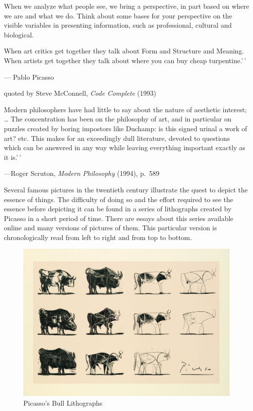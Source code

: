 \hypertarget{different-perspectives-drive-different-views}{%
\label{different-perspectives-drive-different-views}}

When we analyze what people see, we bring a perspective, in part based
on where we are and what we do. Think about some bases for your
perspective on the visible variables in presenting information, such as
professional, cultural and biological.

\smallskip

\noindent {}When art critics get together they talk about Form
and Structure and Meaning. When artists get together they talk about
where you can buy cheap turpentine.'\,'

\hfill --- Pablo Picasso

\hfill quoted by Steve McConnell, \textit{Code Complete} (1993)

\smallskip

\noindent {}Modern philosophers have had little to say about the
nature of aesthetic interest; \ldots{} The concentration has been on the
philosophy of art, and in particular on puzzles created by boring
impostors like Duchamp: is this signed urinal a work of art? etc. This
makes for an exceedingly dull literature, devoted to questions which can
be answered in any way while leaving everything important exactly as it
is.'\,'

\hfill

---Roger Scruton, \textit{Modern Philosophy} (1994), p.~589

\hypertarget{essence}{%
\label{essence}}

Several famous pictures in the twentieth century illustrate the quest to
depict the essence of things. The difficulty of doing so and the effort
required to see the essence before depicting it can be found in a series
of lithographs created by Picasso in a short period of time. There are
essays about this series available online and many versions of pictures
of them. This particular version is chronologically read from left to
right and from top to bottom.

\begin{figure}
\centering
\includegraphics{./fiPicassoBulls.jpg}
\caption{Picasso's Bull Lithographs}
\end{figure}

